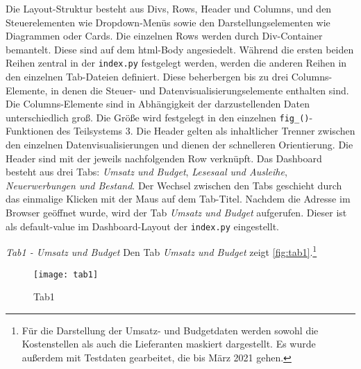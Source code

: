     Die Layout-Struktur besteht aus Divs, Rows, Header und Columns, und den Steuerelementen wie Dropdown-Menüs sowie den Darstellungselementen wie Diagrammen oder
    Cards. Die einzelnen Rows werden durch Div-Container bemantelt. Diese sind auf dem html-Body angesiedelt.
    Während die ersten beiden Reihen zentral in der \texttt{index.py} festgelegt werden, werden die anderen Reihen in den einzelnen Tab-Dateien definiert. 
    Diese beherbergen bis zu drei Columns-Elemente, in denen die Steuer- und Datenvisualisierungselemente enthalten sind.
    Die Columns-Elemente sind in Abhängigkeit der darzustellenden Daten unterschiedlich groß. 
    Die Größe wird festgelegt in den einzelnen \texttt{fig\_()}-Funktionen des Teilsystems 3.
    Die Header gelten als inhaltlicher Trenner zwischen den einzelnen Datenvisualisierungen und dienen der schnelleren Orientierung. 
    Die Header sind mit der jeweils nachfolgenden Row verknüpft. Das Dashboard besteht aus drei Tabs: \textit{Umsatz und Budget}, 
    \textit{Lesesaal und Ausleihe}, \textit{Neuerwerbungen und Bestand}. Der Wechsel zwischen den Tabs geschieht durch das einmalige
    Klicken mit der Maus auf dem Tab-Titel. Nachdem die Adresse im Browser geöffnet wurde, wird der Tab \textit{Umsatz und Budget} aufgerufen. Dieser ist
    als default-value im Dashboard-Layout der \texttt{index.py} eingestellt.

    \clearpage
    \noindent
    \textit{Tab1 - Umsatz und Budget} 
    Den Tab \textit{Umsatz und Budget} zeigt \autoref{fig:tab1}.\footnote{Für die Darstellung der Umsatz- und
    Budgetdaten werden sowohl die Kostenstellen als auch die Lieferanten maskiert dargestellt. Es wurde außerdem mit Testdaten
    gearbeitet, die bis März 2021 gehen.}

    
    \begin{figure}[H]
        \centering
            \texttt{[image: tab1]}
            \caption{Tab1}
            \label{fig:tab1}
    \end{figure}

